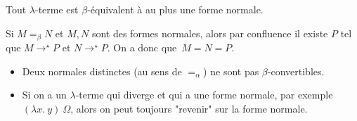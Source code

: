 \documentclass{../notes}
\begin{document}
  \begin{prop}
    Tout $\lambda$-terme est $\beta$-équivalent à au plus une forme normale.
  \end{prop}
  \begin{prv}
    Si $M =_\beta N$ et  $M,N$ sont des formes normales, alors par confluence il existe $P$ tel que $M \to^\star P$ et $N \to^\star P$.
    On a donc que~$M = N = P$.
  \end{prv}

  \begin{rmk}[Conséquences]
    \begin{itemize}
      \item Deux normales distinctes (au sens de $=_\alpha$) ne sont pas $\beta$-convertibles.
      \item Si on a un $\lambda$-terme qui diverge et qui a une forme normale, par exemple $(\lambda x.\: y) \: \Omega$, alors on peut toujours "revenir" sur la forme normale.
    \end{itemize}
  \end{rmk}
\end{document}
